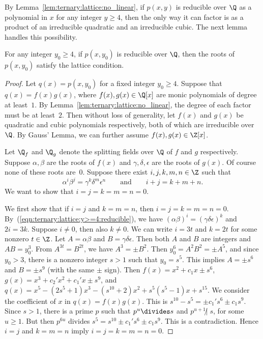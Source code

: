 \documentclass[11pt]{article}
\begin{document}
By Lemma~\ref{lem:ternary:lattice:no_linear},
if $p(x,y)$ is reducible over $\Q$ as a polynomial in $x$ for any integer $y \ge 4$,
then the only way it can factor is as a product of an irreducible quadratic and an irreducible cubic. 
The next lemma handles this possibility.

\begin{lemma} \label{lem:ternary:lattice:y>=4:reducible}
 For any integer $y_0 \ge 4$,
 if $p(x,y_0)$ is reducible over $\Q$,
 then the roots of $p(x,y_0)$ satisfy the lattice condition.
\end{lemma}

\begin{proof}
 Let $q(x) = p(x,y_0)$ for a fixed integer $y_0 \ge 4$.
 Suppose that $q(x) = f(x) g(x)$,
 where $f(x), g(x) \in \Q[x]$ are monic polynomials of degree at least~$1$.
 By Lemma~\ref{lem:ternary:lattice:no_linear},
 the degree of each factor must be at least~$2$.
 Then without loss of generality,
 let $f(x)$ and $g(x)$ be quadratic and cubic polynomials respectively,
 both of which are irreducible over $\Q$.
 By Gauss' Lemma,
 we can further assume $f(x), g(x) \in \Z[x]$.
 
 Let $\Q_f$ and $\Q_g$ denote the splitting fields over $\Q$ of $f$ and $g$ respectively.
 Suppose $\alpha, \beta$ are the roots of $f(x)$ and $\gamma, \delta, \epsilon$ are the roots of $g(x)$.
 Of course none of these roots are~$0$.
 Suppose there exist $i,j,k,m,n \in \Z$ such that 
 \begin{equation} \label{eqn:ternary:lattice:y>=4:reducible}
  \alpha^i \beta^j = \gamma^k \delta^m \epsilon^n 
  \qquad \text{and} \qquad
  i+j = k+m+n.
 \end{equation}
 We want to show that $i=j=k=m=n=0$.

 We first show that if $i=j$ and $k=m=n$,
 then $i=j=k=m=n=0$.
 By~(\ref{eqn:ternary:lattice:y>=4:reducible}),
 we have $(\alpha \beta)^i = (\gamma \delta \epsilon)^k$ and $2 i = 3 k$.
 Suppose $i \neq 0$,
 then also $k \neq 0$.
 We can write $i = 3 t$ and $k = 2 t$ for some nonzero $t \in \Z$.
 Let $A = \alpha \beta$ and $B = \gamma \delta \epsilon$.
 Then both $A$ and $B$ are integers and $A B = y_0^3$.
 From $A^{3t} = B^{2t}$,
 we have $A^3 = \pm B^2$.
 Then $y_0^6 = A^2 B^2 = \pm A^5$,
 and since $y_0 > 3$,
 there is a nonzero integer $s > 1$ such that $y_0 = s^5$.
 This implies $A = \pm s^6$ and $B = \pm s^9$ (with the same $\pm$ sign).
 Then $f(x) = x^2 + c_1 x \pm s^6$, $g(x) = x^3 + c_2' x^2 + c_1' x \pm s^9$,
 and $q(x) = x^5 - (2 s^5 + 1) x^3 - (s^{10} + 2) x^2 + s^5 (s^5-1) x + s^{15}$.
 We consider the coefficient of $x$ in $q(x) = f(x) g(x)$.
 This is $s^{10} - s^5 = \pm c_1' s^6 \pm c_1 s^9$.
 Since $s > 1$,
 there is a prime $p$ such that $p^u \divides s$ and $p^{u+1} \not |\; s$,
 for some $u \ge 1$.
 But then $p^{6u}$ divides $s^5 = s^{10} \pm c_1' s^6 \pm c_1 s^9$.
 This is a contradiction.
 Hence $i=j$ and $k=m=n$ imply $i=j=k=m=n=0$.


\end{proof}
\end{document}
